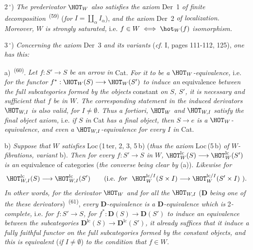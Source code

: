 2\,$^{\circ}$) \textit{The prederivator} $\HOT_W$ \textit{also satisfies the axiom} Der~1 \textit{of finite decomposition}~\textsuperscript{(59)} (\textit{for} $I = \coprod_{\alpha} I_{\alpha}$), \textit{and the axiom} Der~2 \textit{of localization. Moreover, $W$ is strongly saturated,} i.e. $f \in W \iff \hot_W(f)$ \textit{isomorphism.}

3\,$^{\circ}$) \textit{Concerning the axiom} Der~3 \textit{and its variants} (\textit{cf.} I, pages 111-112, 125), \textit{one has this:}

a)~\textsuperscript{(60)}. \textit{Let $f : S' \longrightarrow S$ be an arrow in} Cat. \textit{For it to be a} $\HOT_W$\textit{-equivalence,} i.e. \textit{for the functor} $f^* : \HOT_W(S) \longrightarrow \HOT_W(S')$ \textit{to induce an} equivalence \textit{between the full subcategories formed by the objects} constant \textit{on $S$, $S'$, it is necessary and sufficient that $f$ be in $W$. The corresponding statement in the induced derivators} $\HOT_{W,I}$ \textit{is also valid, for $I \neq \emptyset$. Thus a fortiori,} $\HOT_W$ \textit{and} $\HOT_{W,I}$ \textit{satisfy}
\textit{the final object axiom,} i.e. \textit{if $S$ in} Cat \textit{has a final object, then $S \longrightarrow e$ is a} $\HOT_W$\textit{-equivalence, and even a} $\HOT_{W,I}$\textit{-equivalence for every $I$ in} Cat.

b) \textit{Suppose that $W$ satisfies} Loc\,(1\,ter, 2, 3, 5\,b) (\textit{thus the axiom} Loc\,(5\,b) \textit{of $W$-fibrations, variant} b). \textit{Then for every $f : S' \longrightarrow S$ in $W$,} $\HOT^{\mathrm{lc}}_W(S) \longrightarrow \HOT^{\mathrm{lc}}_W(S')$ \textit{is an} equivalence of categories (\textit{the converse being clear by} (a)). \textit{Likewise for} %
\[
\HOT^{\mathrm{lc}}_{W,I}(S) \longrightarrow \HOT^{\mathrm{lc}}_{W,I}(S') \qquad (\text{i.e. \textit{for}}\ \ \HOT^{\mathrm{lc}/I}_W(S \times I) \longrightarrow \HOT^{\mathrm{lc}/I}_W(S' \times I)\ ).
\]
\textit{In other words, for the derivator} $\HOT_W$ \textit{and for all the} $\HOT_{W,I}$ ($\mathbf{D}$ \textit{being one of the these derivators})~\textsuperscript{(61)}, \textit{every $\mathbf{D}$-equivalence is a $\mathbf{D}$-equivalence which is} 2\textit{-complete,} i.e. \textit{for $f : S' \longrightarrow S$, for $f^* : \mathbf{D}(S) \longrightarrow \mathbf{D}(S')$ to induce an equivalence between the subcategories $\mathbf{D}^{\mathrm{lc}}(S) \longrightarrow \mathbf{D}^{\mathrm{lc}}(S')$, it already suffices that it induce a fully faithful functor on the full subcategories formed by the constant objects, and this is equivalent} (\textit{if $I \neq \emptyset$}) \textit{to the condition that $f \in W$.} %

